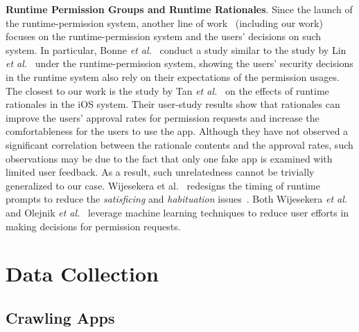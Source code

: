 \textbf{Runtime Permission Groups and Runtime Rationales}. Since the launch of the runtime-permission system, another line of work~\cite{conf/soups/BonnePBT17,conf/huc/LinSALHZ12,conf/chi/TanNTNTEW14} (including our work) focuses on the runtime-permission system and the users' decisions on such system. 
In particular, Bonne \emph{et al.}~\cite{conf/soups/BonnePBT17} conduct a study similar to the study by Lin \emph{et al.}~\cite{conf/huc/LinSALHZ12} under the runtime-permission system, showing the users' security decisions in the runtime system also rely on their expectations of the permission usages. 
The closest to our work is the study by Tan \emph{et al.}~\cite{conf/chi/TanNTNTEW14} on the effects of runtime rationales in the iOS system. 
Their user-study results show that rationales can improve the users' approval rates for permission requests and increase the comfortableness for the users to use the app. 
Although they have not observed a significant correlation between the rationale contents and the approval rates, such observations may be due to the fact that only one fake app is examined with limited user feedback. 
As a result, such unrelatedness cannot be trivially generalized to our case. Wijesekera et al.~\cite{conf/sp/WijesekeraBTREW17} redesigns the timing of runtime prompts to reduce the \emph{satisficing} and \emph{habituation} issues~\cite{conf/www/AkhaweAVS13,Wogalter2002ResearchbasedGF,harbach2013sorry,conf/soups/SchaubBDC15}. 
Both Wijesekera \emph{et al.}~\cite{conf/sp/WijesekeraBTREW17} and Olejnik \emph{et al.}~\cite{conf/sp/OlejnikDMHKH17} leverage machine learning techniques to reduce user efforts in making decisions for permission requests. 


\vspace{-0.1in}
\section{Data Collection}
\label{sec:data}

\vspace{-0.07in}
\subsection{Crawling Apps}

